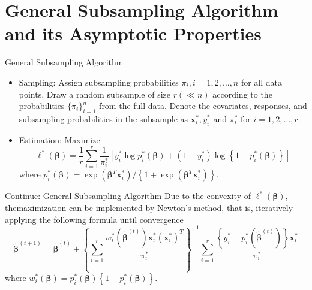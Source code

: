 \documentclass[12pt]{beamer}
\begin{document}

\section{General Subsampling Algorithm and its Asymptotic Properties}
\begin{frame}{General Subsampling Algorithm}
\begin{itemize}
\item Sampling: Assign subsampling probabilities $\pi_{i},i=1,2,\dots,n$ for all data points. Draw a random subsample
of size $r (\ll n)$ according to the probabilities $\{\pi_i\}_{i=1}^n$ from the full data. Denote the covariates, responses, and
subsampling probabilities in the subsample as $\mathbf{x}_i^{*}, y_i^{*}$ and $\pi_i^{*}$ for $i=1,2,\dots,r$. 
\item Estimation: Maximize
$$
\ell^{*}(\boldsymbol{\beta})=\frac{1}{r} \sum_{i=1}^{r} \frac{1}{\pi_{i}^{*}}\left[y_{i}^{*} \log p_{i}^{*}(\boldsymbol{\beta})+\left(1-y_{i}^{*}\right) \log \left\{1-p_{i}^{*}(\boldsymbol{\beta})\right\}\right]
$$
where $p_i^{*}(\mathbf{\beta})=\exp \left(\boldsymbol{\beta}^{T} \mathbf{x}_{i}^{*}\right) /\left\{1+\exp \left(\boldsymbol{\beta}^{T} \mathbf{x}_{i}^{*}\right)\right\}$.
\end{itemize}
\end{frame}

\begin{frame}{Continue: General Subsampling Algorithm}
Due to the convexity of $\ell^{*}(\mathbf{\beta})$, themaximization can be implemented by Newton’s method, that is, iteratively applying the following formula until convergence
$$
\tilde{\boldsymbol{\beta}}^{(t+1)}=\tilde{\boldsymbol{\beta}}^{(t)}+\left\{\sum_{i=1}^{r} \frac{w_{i}^{*}\left(\tilde{\boldsymbol{\beta}}^{(t)}\right) \mathbf{x}_{i}^{*}\left(\mathbf{x}_{i}^{*}\right)^{T}}{\pi_{i}^{*}}\right\}^{-1} \sum_{i=1}^{r} \frac{\left\{y_{i}^{*}-p_{i}^{*}\left(\tilde{\boldsymbol{\beta}}^{(t)}\right)\right\} \mathbf{x}_{i}^{*}}{\pi_{i}^{*}}
$$
where $w_{i}^{*}(\boldsymbol{\beta})=p_{i}^{*}(\boldsymbol{\beta})\left\{1-p_{i}^{*}(\boldsymbol{\beta})\right\}$.
\end{frame}
\end{document}
